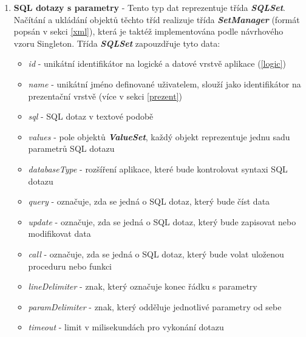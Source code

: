 \documentclass[czech,bachelor,public,dept460,male,cpdeclaration,twoside]{diploma}
\begin{document}
\begin{enumerate}
  \item \textbf{SQL dotazy s parametry} - Tento typ dat reprezentuje třída \textbf{\emph{SQLSet}}. Načítání a ukládání objektů těchto tříd realizuje třída \textbf{\emph{SetManager}} (formát popsán v sekci \ref{xml}), která je taktéž implementována podle návrhového vzoru Singleton. Třída \textbf{\emph{SQLSet}} zapouzdřuje tyto data:
    \begin{itemize}
  	\item \textit{id} - unikátní identifikátor na logické a datové vrstvě aplikace (\ref{logic})
  	\item \textit{name} - unikátní jméno definované uživatelem, slouží jako identifikátor na prezentační vrstvě (více v sekci \ref{prezent})
  	\item \textit{sql} - SQL dotaz v textové podobě
  	\item \textit{values} - pole objektů \textbf{\emph{ValueSet}}, každý objekt reprezentuje jednu sadu parametrů SQL dotazu
  	\item \textit{databaseType} - rozšíření aplikace, které bude kontrolovat syntaxi SQL dotazu
  	\item \textit{query} - označuje, zda se jedná o SQL dotaz, který bude číst data
  	\item \textit{update} - označuje, zda se jedná o SQL dotaz, který bude zapisovat nebo modifikovat data
  	\item \textit{call} - označuje, zda se jedná o SQL dotaz, který bude volat uloženou proceduru nebo funkci
  	\item \textit{lineDelimiter} - znak, který označuje konec řádku s parametry
  	\item \textit{paramDelimiter} - znak, který odděluje jednotlivé parametry od sebe
  	\item \textit{timeout} - limit v milisekundách pro vykonání dotazu
  \end{itemize}
  

\end{enumerate}
\end{document}
